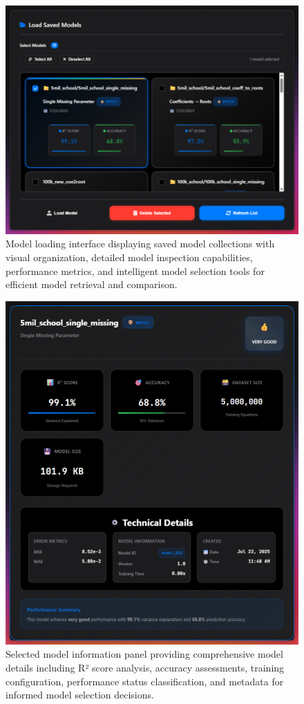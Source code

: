 \documentclass[11pt,a4paper]{report}
\begin{document}
\begin{figure}[H]
\centering
\includegraphics[width=\textwidth]{quadratic_predictor_model_load.png}
\caption{Model loading interface displaying saved model collections with visual organization, detailed model inspection capabilities, performance metrics, and intelligent model selection tools for efficient model retrieval and comparison.}
\label{fig:quadratic_model_load}
\end{figure}

\begin{figure}[H]
\centering
\includegraphics[width=\textwidth]{quadratic_predictor_model_info.png}
\caption{Selected model information panel providing comprehensive model details including R² score analysis, accuracy assessments, training configuration, performance status classification, and metadata for informed model selection decisions.}
\label{fig:quadratic_model_info}
\end{figure}
\end{document}
